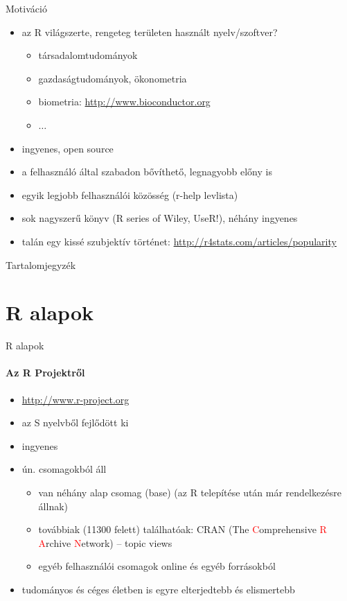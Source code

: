 \documentclass[10pt]{beamer}
\begin{document}
\begin{frame}{Motiváció}
\begin{itemize}
\item az R világszerte, rengeteg területen használt nyelv/szoftver?
\begin{itemize}
\item társadalomtudományok
\item gazdaságtudományok, ökonometria
\item biometria: \textcolor{blue}{\url{http://www.bioconductor.org}}
\item $\dots$
\end{itemize}
\item ingyenes, open source
\item a felhasználó által szabadon bővíthető, legnagyobb előny is
\item egyik legjobb felhasználói közösség (r-help levlista)
\item sok nagyszerű könyv (R series of Wiley, UseR!), néhány ingyenes
\item talán egy kissé szubjektív történet: \textcolor{blue}{\url{http://r4stats.com/articles/popularity}}
\end{itemize}
\end{frame}

\begin{frame}{Tartalomjegyzék}
\tableofcontents
\end{frame}

\section{R alapok}

\begin{frame}{R alapok}
\framesubtitle{Az R Projektről}
\begin{itemize}
\item \textcolor{blue}{\url{http://www.r-project.org}}
\item az S nyelvből fejlődött ki
\item ingyenes
\item ún. csomagokból áll
\begin{itemize}
\item van néhány alap csomag (base) (az R telepítése után már rendelkezésre állnak)
\item továbbiak (11300 felett) találhatóak: CRAN (The \textcolor{red}{C}omprehensive \textcolor{red}{R} \textcolor{red}{A}rchive \textcolor{red}{N}etwork) -- topic views
\item egyéb felhasználói csomagok online és egyéb forrásokból
\end{itemize}
\item tudományos és céges életben is egyre elterjedtebb és elismertebb
\end{itemize}
\end{frame}
\end{document}

